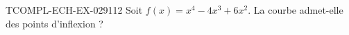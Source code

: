 \begin{exercice}{TCOMPL-ECH-EX-029}{1}{12}
Soit $f(x) = x^4 - 4x^3 + 6x^2$. La courbe admet-elle des points d'inflexion ?

\end{exercice}
